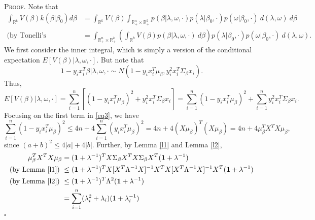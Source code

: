 \documentclass[12pt]{article}
\newcounter{ProofCounter}
\newenvironment{Proof}{\stepcounter{ProofCounter}\textsc{Proof.}}{\hfill$\square$}
\begin{document}
\begin{Proof}
  Note that 
  \begin{align}
    \int_{\mathbb{R}^{k}} V(\beta) k(\beta|\beta_0)d\beta & = \int_{\mathbb{R}^{k}}V(\beta) \int_{\mathbb{R}^{n}_+\times \mathbb{R}^{k}_+}
    p(\beta|\lambda,\omega, \cdot)p(\lambda|\beta_0, \cdot)p(\omega|\beta_0, \cdot)\ d(\lambda, \omega)\ d\beta \nonumber \\
    \text{(by Tonelli's Theorem)} \ & = \int_{\mathbb{R}^{n}_+\times\mathbb{R}^{k}_+} \left( \int_{\mathbb{R}^{k}} V(\beta)p(\beta|\lambda, \omega,
    \cdot)\ d\beta \right) p(\lambda|\beta_0,\cdot)p(\omega|\beta_0, \cdot)\ d(\lambda, \omega).
    \label{eq0}
  \end{align}
  We first consider the inner integral, which is simply a version of the conditional expectation $E[V(\beta)|\lambda,\omega,\cdot]$.
  But note that 
  \begin{equation*}
    1 - y_ix_i^T\beta | \lambda, \omega, \cdot \sim N\left( 1 - y_ix_i^T\mu_{\beta}, y_i^2 x_i^T \Sigma_{\beta}x_i\right).
    \label{eq2}
  \end{equation*}
  Thus,
  \begin{equation}
    E[V(\beta)|\lambda,\omega,\cdot] = \sum_{i=1}^{n}\left[(1 - y_ix_i^T\mu_{\beta})^2 + y_i^2 x_i^T \Sigma_{\beta} x_i\right] = \sum_{i=1}^{n}
    (1 - y_ix_i^T\mu_{\beta})^2 + \sum_{i=1}^{n}y_i^2x_i^T\Sigma_{\beta}x_i.
    \label{eq3}
  \end{equation}
  Focusing on the first term in \eqref{eq3}, we have 
  \begin{equation}
    \sum_{i=1}^{n}(1 - y_i x_i^T \mu_{\beta})^2 \leq 4n + 4\sum_{i=1}^{n}(y_ix_i^T \mu_{\beta})^2 = 4n + 4(X\mu_{\beta})^T (X\mu_{\beta}) 
    = 4n + 4\mu_{\beta}^T X^T X \mu_{\beta},
    \label{eq4}
  \end{equation}
  since $(a + b)^2 \leq 4|a| + 4|b|$. Further, by Lemma \ref{l1} and Lemma \ref{l2},
  \begin{align}
    \mu_{\beta}^T X^T X \mu_{\beta} & = (\bm{1} + \lambda^{-1})^T X \Sigma_{\beta}X^T X\Sigma_{\beta} X^T (\bm{1} + \lambda^{-1}) \nonumber \\
    \text{(by Lemma \ref{l1})}\ & \leq (\bm{1} + \lambda^{-1})^T X[X^T\Lambda^{-1}X]^{-1}X^T X[X^T\Lambda^{-1}X]^{-1}X^T (\bm{1} + \lambda^{-1}) \nonumber \\
    \text{(by Lemma \ref{l2})}\ & \leq (\bm{1} + \lambda^{-1})^T \Lambda^{2} (\bm{1} + \lambda^{-1})\nonumber \\
    & = \sum_{i=1}^{n}(\lambda_i^2 + \lambda_i)(1 + \lambda_i^{-1}) \nonumber \\

\end{align}
\end{Proof}
\end{document}
